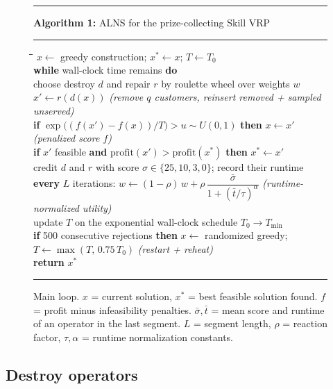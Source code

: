\documentclass[10pt, a4paper]{article}
\begin{document}
\begin{figure}[t]
\small
\hrule\vspace{2pt}
\textbf{Algorithm 1:} ALNS for the prize-collecting Skill VRP
\vspace{2pt}\hrule\vspace{4pt}
\begin{tabbing}
\hspace{1.2em}\=\hspace{1.2em}\=\hspace{1.2em}\=\kill
$x \leftarrow$ greedy construction; \quad $x^{*} \leftarrow x$; \quad
$T \leftarrow T_0$\\
\textbf{while} wall-clock time remains \textbf{do}\\
\>choose destroy $d$ and repair $r$ by roulette wheel over weights $w$\\
\>$x' \leftarrow r(d(x))$
  \quad\emph{(remove $q$ customers, reinsert removed + sampled unserved)}\\
\>\textbf{if} $\exp\bigl((f(x') - f(x))/T\bigr) > u \sim U(0,1)$
  \textbf{then} $x \leftarrow x'$
  \quad\emph{(penalized score $f$)}\\
\>\textbf{if} $x'$ feasible \textbf{and} $\mathrm{profit}(x') >
  \mathrm{profit}(x^{*})$ \textbf{then} $x^{*} \leftarrow x'$\\
\>credit $d$ and $r$ with score $\sigma \in \{25, 10, 3, 0\}$; record their runtime\\
\>\textbf{every} $L$ iterations: \(w \leftarrow (1-\rho)\,w +
  \rho\,\dfrac{\bar\sigma}{1 + (\bar t / \tau)^{\alpha}}\)
  \quad\emph{(runtime-normalized utility)}\\
\>update $T$ on the exponential wall-clock schedule $T_0 \to T_{\min}$\\
\>\textbf{if} 500 consecutive rejections \textbf{then} $x \leftarrow$
  randomized greedy; \ $T \leftarrow \max(T,\, 0.75\,T_0)$
  \quad\emph{(restart + reheat)}\\
\textbf{return} $x^{*}$
\end{tabbing}
\vspace{2pt}\hrule
\caption{Main loop. $x$ = current solution, $x^{*}$ = best feasible
solution found. $f$ = profit minus infeasibility penalties.
$\bar\sigma, \bar t$ = mean score and runtime of an operator in the last
segment. $L$ = segment length, $\rho$ = reaction factor, $\tau, \alpha$ =
runtime normalization constants.}
\label{alg:alns}
\end{figure}

\subsection{Destroy operators}
\end{document}
